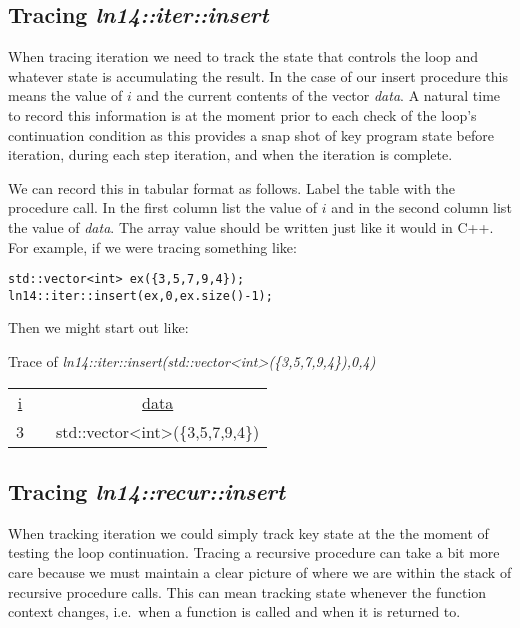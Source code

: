 \documentclass[nobib]{tufte-handout}
\begin{document}
\subsection*{Tracing \textit{ln14::iter::insert}}

When tracing iteration we need to track the state that controls the loop and whatever state is accumulating the result. In the case of our insert procedure this means the value of \(i\) and the current contents of the vector \textit{data}. A natural time to record this information is at the moment prior to each check of the loop's continuation condition as this provides a snap shot of key program state before iteration, during each step iteration, and when the iteration is complete.

We can record this in tabular format as follows. Label the table with the procedure call. In the first column list the value of \(i\) and in the second column list the value of \textit{data}. The array value should be written just like it would in C++. For example, if we were tracing something like:

\begin{lstlisting}
std::vector<int> ex({3,5,7,9,4});
ln14::iter::insert(ex,0,ex.size()-1);
\end{lstlisting}

Then we might start out like:

\begin{framed}
Trace of \textit{ln14::iter::insert(std::vector<int>(\{3,5,7,9,4\}),0,4)}
\begin{center}
\begin{tabular}{ccc}
  \underline{i} & \hspace{.25in} & \underline{data} \\
  3 & & std::vector<int>(\{3,5,7,9,4\})
\end{tabular}
\end{center}
\end{framed}

\subsection*{Tracing \textit{ln14::recur::insert}}

When tracking iteration we could simply track key state at the the moment of testing the loop continuation. Tracing a recursive procedure can take a bit more care because we must maintain a clear picture of where we are within the stack of recursive procedure calls. This can mean tracking state whenever the function context changes, i.e.\ when a function is called and when it is returned to.
\end{document}

